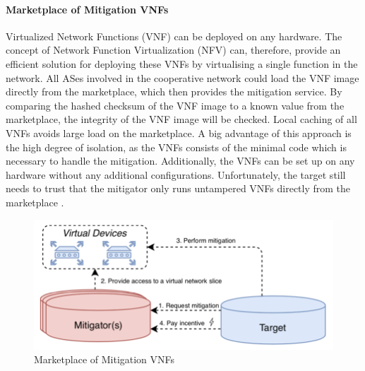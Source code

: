 \paragraph{Marketplace of Mitigation VNFs}
Virtualized  Network Functions (VNF) can be deployed on any hardware. The concept of Network Function Virtualization (NFV) can, therefore, provide an efficient solution for deploying these VNFs by virtualising a single function in the network. All ASes involved in the cooperative network could load the VNF image directly from the marketplace, which then provides the mitigation service. By comparing the hashed checksum of the VNF image to a known value from the marketplace, the integrity of the VNF image will be checked. Local caching of all VNFs avoids large load on the marketplace. A big advantage of this approach is the high degree of isolation, as the VNFs consists of the minimal code which is necessary to handle the mitigation. Additionally, the VNFs can be set up on any hardware without any additional configurations. Unfortunately, the target still needs to trust that the mitigator only runs untampered VNFs directly from the marketplace \cite{Mannhart2018}.
\begin{figure}[ht]
  \begin{center}
  \includegraphics[scale=0.5]{Talk7/img/ddos/cooperative_network_marketplace_vnfs}
  \end{center}
  \caption{Marketplace of Mitigation VNFs}
  \label{ddos_marketplace_vnf}
\end{figure}

